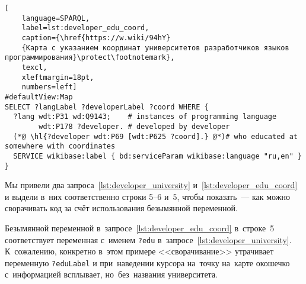 \begin{lstlisting}[
	language=SPARQL,
	label=lst:developer_edu_coord,
	caption={\href{https://w.wiki/94hY}
    {Карта с указанием координат университетов разработчиков языков программирования}\protect\footnotemark},
	texcl,
    xleftmargin=18pt,
    numbers=left]
#defaultView:Map
SELECT ?langLabel ?developerLabel ?coord WHERE {
  ?lang wdt:P31 wd:Q9143;    # instances of programming language
        wdt:P178 ?developer. # developed by developer
  (*@ \hl{?developer wdt:P69 [wdt:P625 ?coord].} @*)# who educated at somewhere with coordinates
  SERVICE wikibase:label { bd:serviceParam wikibase:language "ru,en" }
}
\end{lstlisting}

Мы привели два запроса~\ref{lst:developer_university} и~\ref{lst:developer_edu_coord} 
и выдели в~них соответственно строки 5--6 и~5, 
чтобы показать~--- как можно сворачивать код за счёт использования безымянной переменной. 

Безымянной переменной в~запросе~\ref{lst:developer_edu_coord} в~строке~5 
соответствует переменная с~именем \lstinline|?edu| в~запросе~\ref{lst:developer_university}. 
К~сожалению, конкретно в~этом примере <<сворачивание>> утрачивает переменную \lstinline|?eduLabel| 
и при~наведении курсора на~точку на~карте окошечко с~информацией всплывает, но~без~названия университета.





